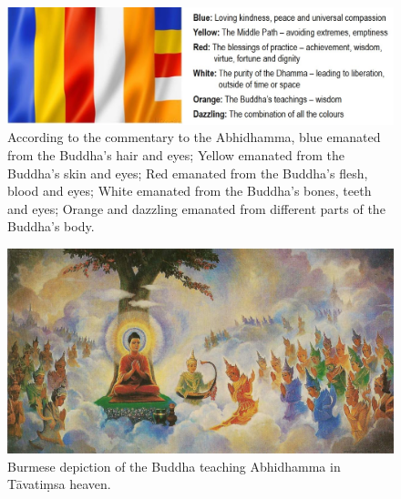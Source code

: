 \begin{figure}[h]
\centering
\includegraphics[width=1.0\linewidth]{./Diagrams/Flag}
\caption{According to the commentary to the Abhidhamma, blue emanated from the Buddha’s hair and eyes; Yellow emanated from the Buddha’s skin and eyes; Red emanated from the Buddha’s flesh, blood and eyes; White emanated from the Buddha’s bones, teeth and eyes; Orange and dazzling emanated from different parts of the Buddha’s body.}
\label{fig:Flag}
\end{figure}

\pagebreak

\begin{figure}[h]
\centering
\includegraphics[width=0.9\linewidth]{./Diagrams/Tavatimsa}
\caption{Burmese depiction of the Buddha teaching Abhidhamma in Tāvatiṃsa heaven.}
\label{fig:Tavatimsa}
\end{figure}

